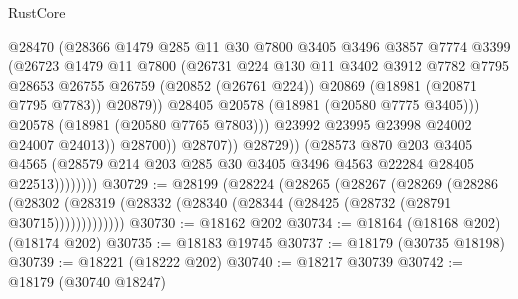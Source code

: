 \begin{lexlean}{RustCore}
\begin{coremodule}
                                  @28470
                                  (@28366
                                    @1479
                                    @285
                                    @11
                                    @30
                                    @7800
                                    @3405
                                    @3496
                                    @3857
                                    @7774
                                    @3399
                                    (@26723
                                      @1479
                                      @11
                                      @7800
                                      (@26731
                                        @224
                                        @130
                                        @11
                                        @3402
                                        @3912
                                        @7782
                                        @7795
                                        @28653
                                        @26755
                                        @26759
                                        (@20852 (@26761 @224))
                                        @20869
                                        (@18981 (@20871 @7795 @7783))
                                        @20879))
                                    @28405
                                    @20578
                                    (@18981 (@20580 @7775 @3405)))
                                  @20578
                                  (@18981 (@20580 @7765 @7803)))
                                @23992
                                @23995
                                @23998
                                @24002
                                @24007
                                @24013))
                            @28700))
                        @28707))
                    @28729))
                (@28573
                  @870
                  @203
                  @3405
                  @4565
                  (@28579 @214 @203 @285 @30 @3405 @3496 @4563 @22284 @28405 @22513))))))))
@30729 := @28199
    (@28224
      (@28265
        (@28267
          (@28269
            (@28286
              (@28302 (@28319 (@28332 (@28340 (@28344 (@28425 (@28732 (@28791 @30715)))))))))))))
@30730 := @18162 @202
@30734 := @18164 (@18168 @202) (@18174 @202)
@30735 := @18183 @19745
@30737 := @18179 (@30735 @18198)
@30739 := @18221 (@18222 @202)
@30740 := @18217 @30739
@30742 := @18179 (@30740 @18247)

\end{coremodule}
\end{lexlean}
